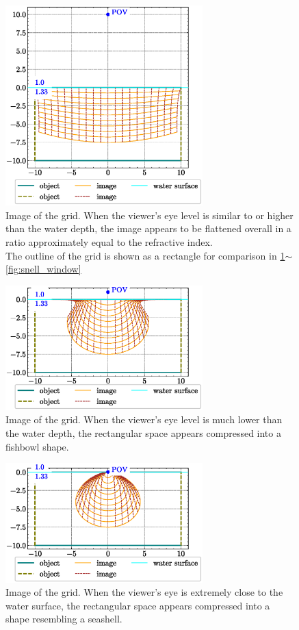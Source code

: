 \documentclass[twocolumn]{article}
\begin{document}
\begin{figure}[!t]
	\centering
	\includegraphics[width=3in]{figs/image_underwater1.eps}
	\caption{Image of the grid. When the viewer's eye level is similar to or higher than the water depth, the image appears to be flattened overall in a ratio approximately equal to the refractive index.\\
	The outline of the grid is shown as a rectangle for comparison in \ref{fig:image_underwater}$\sim$\ref{fig:snell_window}}
	\label{fig:image_underwater}
\end{figure}

\begin{figure}[!t]
	\centering
	\includegraphics[width=3in]{figs/fishjar.eps}
	\caption{Image of the grid. When the viewer's eye level is much lower than the water depth, the rectangular space appears compressed into a fishbowl shape.}
	\label{fig:fishbowl}
\end{figure}

\begin{figure}[!t]
	\centering
	\includegraphics[width=3in]{figs/seashell_shape.eps}
	\caption{Image of the grid. When the viewer's eye is extremely close to the water surface, the rectangular space appears compressed into a shape resembling a seashell.}
	\label{fig:seashell}
\end{figure}
\end{document}
